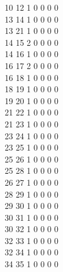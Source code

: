 \documentclass[11pt,titlepage,dvipdfmx,twoside]{jarticle}
\begin{document}
\begin{oframed}
{ 10 12  1  0  0  0  0                                                      \\
 13 14  1  0  0  0  0                                                      \\
 13 21  1  0  0  0  0                                                      \\
 14 15  2  0  0  0  0                                                      \\
 14 16  1  0  0  0  0                                                      \\
 16 17  2  0  0  0  0                                                      \\
 16 18  1  0  0  0  0                                                      \\
 18 19  1  0  0  0  0                                                      \\
 19 20  1  0  0  0  0                                                      \\
 21 22  1  0  0  0  0                                                      \\
 21 23  1  0  0  0  0                                                      \\
 23 24  1  0  0  0  0                                                      \\
 23 25  1  0  0  0  0                                                      \\
 25 26  1  0  0  0  0                                                      \\
 25 28  1  0  0  0  0                                                      \\
 26 27  1  0  0  0  0                                                      \\
 28 29  1  0  0  0  0                                                      \\
 29 30  1  0  0  0  0                                                      \\
 30 31  1  0  0  0  0                                                      \\
 30 32  1  0  0  0  0                                                      \\
 32 33  1  0  0  0  0                                                      \\
 32 34  1  0  0  0  0                                                      \\
 34 35  1  0  0  0  0                                                      \\
}
\end{oframed}
\end{document}
